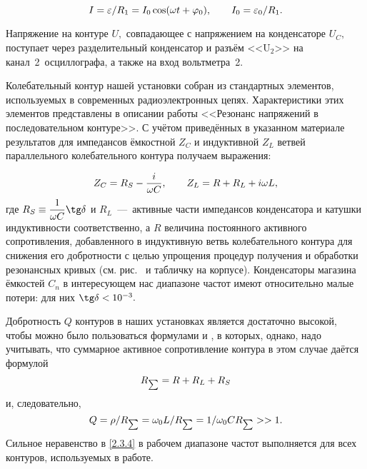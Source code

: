 \begin{equation}\eqmark{2.3.1}
	I=\varepsilon/R_1=I_0\cos(\omega t+\varphi_0), \qquad I_0=\varepsilon_0/R_1.
\end{equation}

Напряжение на контуре $U,$ совпадающее с напряжением на конденсаторе $U_C,$ поступает  через разделительный конденсатор и разъём <<$\text{U}_2$>> на канал~2~осциллографа, а также на вход вольтметра~2.%

Колебательный контур нашей установки собран из стандартных элементов, используемых в современных радиоэлектронных цепях. Характеристики этих элементов представлены в описании работы <<Резонанс напряжений в последовательном контуре>>.  С учётом приведённых в указанном материале результатов для импедансов ёмкостной $Z_C$ и индуктивной $Z_L$ ветвей параллельного колебательного контура получаем выражения:

\begin{equation}\eqmark{2.3.2}
	Z_C=R_S-\dfrac{i}{\omega C}, \qquad Z_L=R+R_L+i\omega L,
\end{equation}
где $R_S\equiv\dfrac{1}{\omega C}\tg\delta$ и $R_L$~---~активные части импедансов конденсатора и катушки индуктивности соответственно, а $R$  величина постоянного активного сопротивления, добавленного в индуктивную ветвь колебательного контура для снижения его добротности с целью упрощения  процедур получения и обработки резонансных кривых (см. рис.~ и табличку на корпусе). Конденсаторы магазина ёмкостей $C_n$ в интересующем нас диапазоне частот имеют относительно малые потери: для них $\tg\delta<10^{-3}.$

Добротность $Q$ контуров в наших установках является достаточно высокой, чтобы можно было пользоваться формулами  и , в которых, однако, надо учитывать, что суммарное активное сопротивление контура в этом случае даётся формулой
\begin{equation}\eqmark{2.3.3}
	R_{\scriptscriptstyle \sum}=R+R_L+R_S
\end{equation}
и, следовательно,
\begin{equation}\eqmark{2.3.4}
	Q=\rho/R_{\scriptscriptstyle \sum}=\omega_0 L/R_{\scriptscriptstyle \sum}=1/\omega_0 CR_{\scriptscriptstyle \sum}>>1.
\end{equation}
Сильное неравенство в \eqref{2.3.4} в рабочем диапазоне частот выполняется для всех контуров, используемых в работе.

